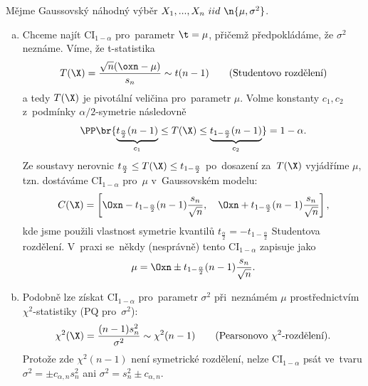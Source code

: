 \begin{example}\label{priklad}
	Mějme Gaussovský náhodný výběr $X_1,...,X_n~iid~\n{\mu,\sigma^2}$. \begin{enumerate}[a)]
		\item Chceme najít $\mathrm{CI}_{1-\alpha}$ pro~parametr $\t=\mu$, přičemž předpokládáme, že $\sigma^2$ neznáme. Víme, že t-statistika 
		$$ T(\X)=\frac{\sqrt{n}(\oxn-\mu)}{s_n}\sim t(n-1)\qquad(\text{Studentovo rozdělení}) $$
		a tedy $T(\X)$ je pivotální veličina pro~parametr $\mu$. Volme konstanty $c_1,c_2$ z~podmínky $\alpha/2$-symetrie následovně 
		$$ \PP\br{\underbrace{t_{\frac{\alpha}{2}}(n-1)}_{c_1}\leq T(\X)\leq \underbrace{t_{1-\frac{\alpha}{2}}(n-1)}_{c_2}}=1-\alpha. $$
		Ze soustavy nerovnic $t_{\frac{\alpha}{2}}\leq T(\X)\leq t_{1-\frac{\alpha}{2}}$ po~dosazení za~$T(\X)$ vyjádříme $\mu$, tzn. dostáváme $\mathrm{CI}_{1-\alpha}$ pro~$\mu$ v~Gaussovském modelu:
		$$ C(\X)=\left[ \Oxn-t_{1-\frac{\alpha}{2}}(n-1)\frac{s_n}{\sqrt{n}},\quad \Oxn+ t_{1-\frac{\alpha}{2}}(n-1)\frac{s_n}{\sqrt{n}} \right], $$ kde jsme použili vlastnost symetrie kvantilů $t_{\frac{\alpha}{2}}=-t_{1-\frac{\alpha}{2}}$ Studentova rozdělení. V~praxi se~někdy (nesprávně) tento $\mathrm{CI}_{1-\alpha}$ zapisuje jako 
		$$ \mu=\Oxn\pm t_{1-\frac{\alpha}{2}}(n-1)\frac{s_n}{\sqrt{n}}. $$
		\item Podobně lze získat $\mathrm{CI}_{1-\alpha}$ pro~parametr $\sigma^2$ při~neznámém $\mu$ prostřednictvím $\chi^2$-statistiky (PQ pro~$\sigma^2$):
		$$ \chi^2(\X)=\frac{(n-1)s_n^2}{\sigma^2}\sim\chi^2(n-1)\qquad(\text{Pearsonovo }\chi^2\text{-rozdělení}). $$
		Protože zde $\chi^2(n-1)$ není symetrické rozdělení, nelze $\mathrm{CI}_{1-\alpha}$ psát ve~tvaru $\sigma^2=\pm c_{\alpha,n}s_n^2$ ani $\sigma^2=s_n^2\pm c_{\alpha,n}$.
	\end{enumerate}
\end{example}


